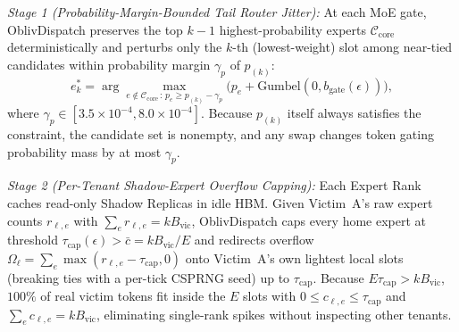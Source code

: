 \documentclass[10pt,journal,compsoc]{IEEEtran}
\def\OD{OblivDispatch}%
\theoremstyle{definition}
\theoremstyle{remark}
\newcommand{\OD}{\textsc{OblivDispatch}}
\begin{document}
\emph{Stage 1 (Probability-Margin-Bounded Tail Router Jitter):} At each MoE gate, \OD{} preserves the top $k-1$ highest-probability experts $\mathcal{C}_{\mathrm{core}}$ deterministically and perturbs only the $k$-th (lowest-weight) slot among near-tied candidates within probability margin $\gamma_p$ of $p_{(k)}$:
\begin{equation}\label{eq:margin_gumbel}
  e_k^* = \arg\max_{e \notin \mathcal{C}_{\mathrm{core}} \,:\, p_e \ge p_{(k)} - \gamma_p} \big( p_e + \mathrm{Gumbel}(0, b_{\mathrm{gate}}(\epsilon)) \big),
\end{equation}
where $\gamma_p \in [3.5 \times 10^{-4}, 8.0 \times 10^{-4}]$. Because $p_{(k)}$ itself always satisfies the constraint, the candidate set is nonempty, and any swap changes token gating probability mass by at most $\gamma_p$.

\emph{Stage 2 (Per-Tenant Shadow-Expert Overflow Capping):} Each Expert Rank caches read-only Shadow Replicas in idle HBM. Given Victim~A's raw expert counts $r_{\ell, e}$ with $\sum_e r_{\ell, e} = k B_{\mathrm{vic}}$, \OD{} caps every home expert at threshold $\tau_{\mathrm{cap}}(\epsilon) > \bar{c} = k B_{\mathrm{vic}}/E$ and redirects overflow $\Omega_\ell = \sum_e \max(r_{\ell, e} - \tau_{\mathrm{cap}}, 0)$ onto Victim~A's own lightest local slots (breaking ties with a per-tick CSPRNG seed) up to $\tau_{\mathrm{cap}}$. Because $E \tau_{\mathrm{cap}} > k B_{\mathrm{vic}}$, $100\%$ of real victim tokens fit inside the $E$ slots with $0 \le c_{\ell, e} \le \tau_{\mathrm{cap}}$ and $\sum_e c_{\ell, e} = k B_{\mathrm{vic}}$, eliminating single-rank spikes without inspecting other tenants.
\end{document}
